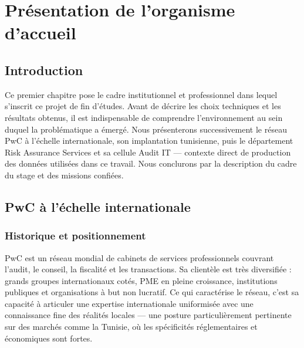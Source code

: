 \chapter{Présentation de l'organisme d'accueil}

\section*{Introduction}

Ce premier chapitre pose le cadre institutionnel et professionnel dans lequel s'inscrit
ce projet de fin d'études. Avant de décrire les choix techniques et les résultats obtenus,
il est indispensable de comprendre l'environnement au sein duquel la problématique a émergé.
Nous présenterons successivement le réseau PwC à l'échelle internationale, son implantation
tunisienne, puis le département Risk Assurance Services et sa cellule Audit IT --- contexte
direct de production des données utilisées dans ce travail. Nous conclurons par la description
du cadre du stage et des missions confiées.

\section{PwC à l'échelle internationale}

\subsection{Historique et positionnement}

PwC est un réseau mondial de cabinets de services professionnels couvrant l'audit, le conseil,
la fiscalité et les transactions. Sa clientèle est très diversifiée : grands groupes
internationaux cotés, PME en pleine croissance, institutions publiques et organisations à but
non lucratif. Ce qui caractérise le réseau, c'est sa capacité à articuler une expertise
internationale uniformisée avec une connaissance fine des réalités locales --- une posture
particulièrement pertinente sur des marchés comme la Tunisie, où les spécificités
réglementaires et économiques sont fortes.

